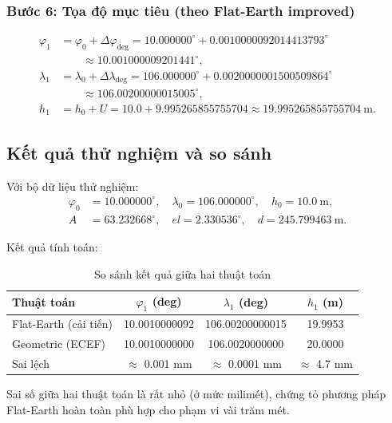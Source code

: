 \subsubsection*{Bước 6: Tọa độ mục tiêu (theo Flat-Earth improved)}
\[
\begin{aligned}
\varphi_1 &= \varphi_0 + \Delta\varphi_{\text{deg}}
= 10.000000^\circ + 0.0010000092014413793^\circ \\
&\qquad\approx \mathbf{10.001000009201441^\circ},\\[6pt]
\lambda_1 &= \lambda_0 + \Delta\lambda_{\text{deg}}
= 106.000000^\circ + 0.0020000001500509864^\circ \\
&\qquad\approx \mathbf{106.00200000015005^\circ},\\[6pt]
h_1 &= h_0 + U = 10.0 + 9.995265855755704 \approx \mathbf{19.995265855755704\ \mathrm{m}}.
\end{aligned}
\]



\subsection{Kết quả thử nghiệm và so sánh}
Với bộ dữ liệu thử nghiệm:
\[
\begin{aligned}
    \varphi_0 &= 10.000000^\circ, \quad \lambda_0 = 106.000000^\circ, \quad h_0 = 10.0~\mathrm{m},\\
    A &= 63.232668^\circ, \quad el = 2.330536^\circ, \quad d = 245.799463~\mathrm{m}.
\end{aligned}
\]

Kết quả tính toán:

\begin{table}[H]
\centering
\caption{So sánh kết quả giữa hai thuật toán}
\begin{tabular}{lccc}
\hline
\textbf{Thuật toán} & $\varphi_1$ (deg) & $\lambda_1$ (deg) & $h_1$ (m) \\
\hline
Flat-Earth (cải tiến) & 10.0010000092 & 106.00200000015 & 19.9953 \\
Geometric (ECEF) & 10.0010000000 & 106.0020000000 & 20.0000 \\
\hline
Sai lệch & $\approx$ 0.001 mm & $\approx$ 0.0001 mm & $\approx$ 4.7 mm \\
\hline
\end{tabular}
\end{table}

Sai số giữa hai thuật toán là rất nhỏ (ở mức milimét), chứng tỏ phương pháp Flat-Earth hoàn toàn phù hợp cho phạm vi vài trăm mét.

